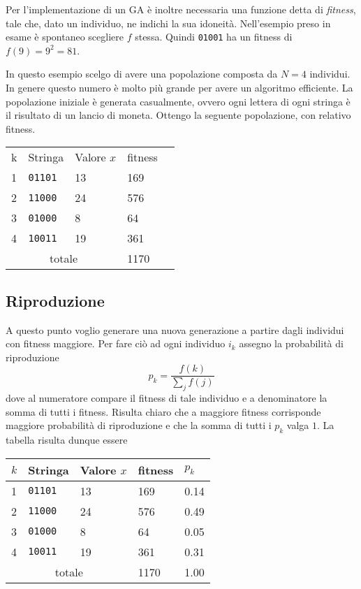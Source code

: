 \documentclass[a4paper, 11pt]{article}
\newcommand{\code}{\texttt}
\begin{document}
Per l'implementazione di un GA è inoltre necessaria una funzione detta di
\textit{fitness}, tale che, dato un individuo, ne indichi la sua idoneità.
Nell'esempio preso in esame è spontaneo scegliere $f$ stessa. Quindi
\code{01001}  ha un fitness di $f(9)=9^2=81$.

In questo esempio scelgo di avere una popolazione composta da $N=4$ individui. In
genere questo numero è molto più grande per avere un algoritmo efficiente. La
popolazione iniziale è generata casualmente, ovvero ogni lettera di ogni stringa
è il risultato di un lancio di moneta. Ottengo la seguente popolazione, con
relativo fitness.

\begin{table}[h!]
\begin{tabular}{lllll}
\multicolumn{1}{l|}{k} & Stringa      & Valore $x$ & fitness &  \\ \cline{1-4}
\multicolumn{1}{l|}{1} & \code{01101} & 13         & 169     &  \\
\multicolumn{1}{l|}{2} & \code{11000} & 24         & 576     &  \\
\multicolumn{1}{l|}{3} & \code{01000} & 8          & 64      &  \\
\multicolumn{1}{l|}{4} & \code{10011} & 19         & 361     &  \\ \cline{1-4}
\multicolumn{3}{c}{totale}                         & 1170    & 
\end{tabular}
\end{table}



\subsection{Riproduzione}

A questo punto voglio generare una nuova generazione a partire dagli individui
con fitness maggiore. Per fare ciò ad ogni individuo $i_k$  assegno la
probabilità di riproduzione 
$$p_k=\frac{f(k)}{\sum\limits_{j}f(j)}$$
dove al numeratore compare il fitness di tale individuo e a denominatore la
somma di tutti i fitness. Risulta chiaro che a maggiore fitness corrisponde
maggiore probabilità di riproduzione e che la somma di tutti i $p_k$ valga $1$.
La tabella risulta dunque essere

\begin{table}[h!]
\begin{tabular}{lllll}
\multicolumn{1}{l|}{$k$} & Stringa        & Valore $x$ & fitness & $p_k$ \\ \hline
\multicolumn{1}{l|}{1}   & \code{01101} & 13         & 169     & 0.14  \\
\multicolumn{1}{l|}{2}   & \code{11000} & 24         & 576     & 0.49  \\
\multicolumn{1}{l|}{3}   & \code{01000} & 8          & 64      & 0.05  \\
\multicolumn{1}{l|}{4}   & \code{10011} & 19         & 361     & 0.31  \\ \hline
\multicolumn{3}{c}{totale}                           & 1170    & 1.00 
\end{tabular}
\end{table}
\end{document}
